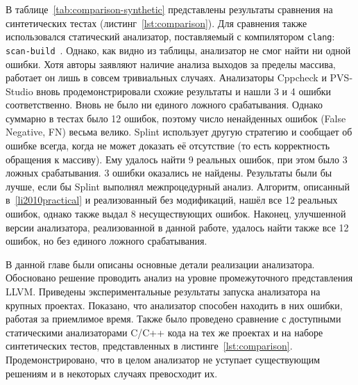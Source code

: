 В таблице~\ref{tab:comparison-synthetic} представлены результаты
сравнения на синтетических тестах (листинг~\ref{lst:comparison}). Для
сравнения также использовался статический анализатор, поставляемый с
компилятором \texttt{clang}:
\texttt{scan-build}~\cite{scan-build}. Однако, как видно из таблицы,
анализатор не смог найти ни одной ошибки. Хотя авторы заявляют наличие
анализа выходов за пределы массива, работает он лишь в совсем
тривиальных случаях. Анализаторы Cppcheck и PVS-Studio вновь
продемонстрировали схожие результаты и нашли 3 и 4 ошибки
соответственно. Вновь не было ни единого ложного срабатывания. Однако
суммарно в тестах было 12 ошибок, поэтому число ненайденных ошибок
(False Negative, FN) весьма велико. Splint использует другую стратегию
и сообщает об ошибке всегда, когда не может доказать её отсутствие (то
есть корректность обращения к массиву). Ему удалось найти 9 реальных
ошибок, при этом было 3 ложных срабатывания. 3 ошибки оказались не
найдены. Результаты были бы лучше, если бы Splint выполнял
межпроцедурный анализ. Алгоритм, описанный в~\ref{li2010practical} и
реализованный без модификаций, нашёл все 12 реальных ошибок, однако
также выдал 8 несуществующих ошибок. Наконец, улучшенной версии
анализатора, реализованной в данной работе, удалось найти также все 12
ошибок, но без единого ложного срабатывания.

\chapterconclusion

В данной главе были описаны основные детали реализации
анализатора. Обосновано решение проводить анализ на уровне
промежуточного представления LLVM.  Приведены экспериментальные
результаты запуска анализатора на крупных проектах. Показано, что
анализатор способен находить в них ошибки, работая за приемлимое
время. Также было проведено сравнение с доступными статическими
анализаторами C/C++ кода на тех же проектах и на наборе синтетических
тестов, представленных в
листинге~\ref{lst:comparison}. Продемонстрировано, что в целом
анализатор не уступает существующим решениям и в некоторых случаях
превосходит их.
